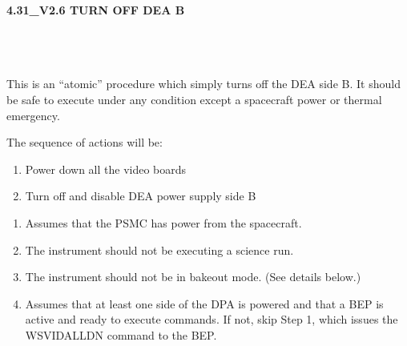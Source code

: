 \documentclass[11pt]{article}
\begin{document}
%
%
%
\newcommand{\be}{\begin{enumerate}}
\newcommand{\ee}{\end{enumerate}}
\newcommand{\bc}{\begin{center}}
\newcommand{\ec}{\end{center}}
\newcommand{\bi}{\begin{itemize}}
\newcommand{\ei}{\end{itemize}}
\newcommand{\bd}{\begin{description}}
\newcommand{\ed}{\end{description}}
\newcommand{\bt}{\begin{tabbing}}
\newcommand{\et}{\end{tabbing}}
\newcommand{\eg}{{\it e.g.~}}
\newcommand{\ie}{{\it i.e.~}}
\newcommand{\ul}{\underline}
\newcommand{\axaf}{{\em AXAF}}
\def\la{\hbox{\rlap{$<$}\lower0.5ex\hbox{$\sim$}\ }}


\large
\centerline {\bf 4.31\_V2.6 TURN OFF DEA B  }
\vspace{0.25in}

\normalsize
{}\\
 \\


 \\
\normalsize
This is an ``atomic'' procedure which simply turns off the DEA side B.
It should be safe to execute under any condition except a spacecraft
power or thermal emergency.


\vspace{0.25in}
\noindent The sequence of actions will be:
\be
\item Power down all the video boards
\vspace{-0.10in}
\item  Turn off and disable DEA power supply side B
\ee


\vspace{0.15in}
\normalsize
{} 
\normalsize
\be
\item Assumes that the PSMC has power from the spacecraft.
\vspace{-0.10in}
\item The instrument should not be executing a science run.
\vspace{-0.10in}
\item The instrument should not be in bakeout mode. (See details below.)
\vspace{-0.10in}
\item Assumes that at least one side of the DPA is powered and that a BEP is active
and ready to execute commands. If not, skip Step 1, which issues the WSVIDALLDN
command to the BEP.
\ee
\end{document}

